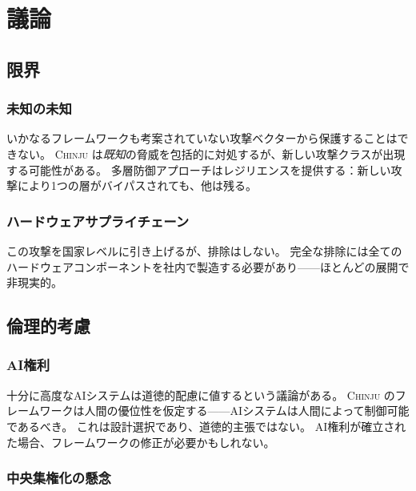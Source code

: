 \documentclass[11pt,a4paper]{article}
\newcommand{\chinju}{\textsc{Chinju}}
\begin{document}
\section{議論}
\label{sec:discussion}

\subsection{限界}

\subsubsection{未知の未知}

いかなるフレームワークも考案されていない攻撃ベクターから保護することはできない。
\chinju{} は\emph{既知}の脅威を包括的に対処するが、新しい攻撃クラスが出現する可能性がある。
多層防御アプローチはレジリエンスを提供する：新しい攻撃により1つの層がバイパスされても、他は残る。

\subsubsection{ハードウェアサプライチェーン}

この攻撃を国家レベルに引き上げるが、排除はしない。
完全な排除には全てのハードウェアコンポーネントを社内で製造する必要があり——ほとんどの展開で非現実的。

\subsection{倫理的考慮}

\subsubsection{AI権利}

十分に高度なAIシステムは道徳的配慮に値するという議論がある。
\chinju{} のフレームワークは人間の優位性を仮定する——AIシステムは人間によって制御可能であるべき。
これは設計選択であり、道徳的主張ではない。
AI権利が確立された場合、フレームワークの修正が必要かもしれない。

\subsubsection{中央集権化の懸念}
\end{document}
